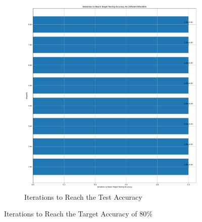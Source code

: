\begin{figure}[H]
\begin{subfigure}[H]{0.48\textwidth}
                \includegraphics[width=\textwidth]{../standard/NMNIST/plots/nmnist_test_iters.pdf}
                \caption{Iterations to Reach the Test Accuracy}
            \end{subfigure}
            \caption{Iterations to Reach the Target Accuracy of 80\%}
        \end{figure}

